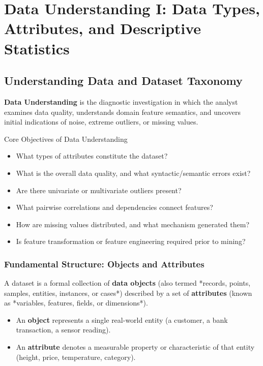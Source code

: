 \chapter{Data Understanding I: Data Types, Attributes, and Descriptive Statistics}
\label{ch:data-understanding-types-statistics-en}

\section{Understanding Data and Dataset Taxonomy}

\textbf{Data Understanding} is the diagnostic investigation in which the analyst examines data quality, understands domain feature semantics, and uncovers initial indications of noise, extreme outliers, or missing values.

\begin{noteblock}{Core Objectives of Data Understanding}
\begin{itemize}
    \item What types of attributes constitute the dataset?
    \item What is the overall data quality, and what syntactic/semantic errors exist?
    \item Are there univariate or multivariate outliers present?
    \item What pairwise correlations and dependencies connect features?
    \item How are missing values distributed, and what mechanism generated them?
    \item Is feature transformation or feature engineering required prior to mining?
\end{itemize}
\end{noteblock}

\subsection{Fundamental Structure: Objects and Attributes}
A dataset is a formal collection of \textbf{data objects} (also termed *records, points, samples, entities, instances, or cases*) described by a set of \textbf{attributes} (known as *variables, features, fields, or dimensions*).
\begin{itemize}
    \item An \textbf{object} represents a single real-world entity (a customer, a bank transaction, a sensor reading).
    \item An \textbf{attribute} denotes a measurable property or characteristic of that entity (height, price, temperature, category).
\end{itemize}

